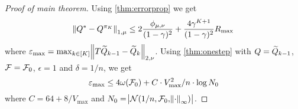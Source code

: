 




\begin{proof}[Proof of main theorem]
	Using \cref{thm:errorprop} we get
	\begin{equation}
		\norm{Q^* - Q^{\pi_K}}_{1,\mu} \leq
		2 \frac{\phi_{\mu, \nu}}{(1-\gamma)^2} +
		\frac{4 \gamma^{K+1}}{(1-\gamma)^2} R_{\max}
	\end{equation}
	where $\varepsilon_{\max} =
	\max_{k \in [K]} \norm{T \widetilde{Q}_{k-1} - \widetilde{Q}_k}_{2, \nu}$.
	Using \cref{thm:onestep} with $Q = \widetilde{Q}_{k-1}$, 
	$\mathcal{F} = \mathcal{F}_0$, $\epsilon = 1$
	and $\delta = 1/n$, we get 
	\begin{equation}
		\varepsilon_{\max} \leq 4 \omega(\mathcal{F}_0)
		+ C \cdot V_{\max}^2/n \cdot \log N_0
	\end{equation}
	where $C = 64 + 8 / V_{\max}$
	and $N_0 = \abs{\mathcal{N}(1/n, \mathcal{F}_0, \norm{\cdot}_\infty)}$.
\end{proof}
